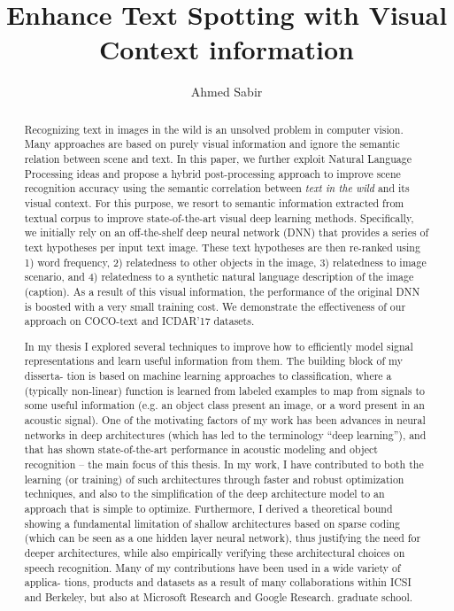\documentclass[phd,tocprelim]{cornell}
\title {Enhance Text Spotting with Visual Context information}
\author {Ahmed Sabir}
\begin{document}
\maketitle
\makecopyright

\begin{abstract}
Recognizing text   in  images in the wild is an unsolved problem  in computer vision. Many  approaches are based on purely visual information and ignore the semantic relation between scene and text. In this paper, we further exploit Natural Language Processing  ideas and propose a hybrid post-processing approach to improve scene recognition accuracy using the semantic correlation between  \textit{text in the wild} and its visual context. For this purpose,  we resort to semantic information extracted from textual corpus to improve state-of-the-art visual deep learning methods. Specifically, we initially rely on an off-the-shelf deep neural network (DNN) that provides a series of text hypotheses per input text image. These text hypotheses are then re-ranked using 1) word frequency, 2) relatedness to other objects in the image, 3) relatedness to image scenario, and 4) relatedness to a synthetic natural language description of the image (caption). As a result of this visual information, the performance of the original DNN is boosted with a very small training cost. We demonstrate the effectiveness of our approach on COCO-text and ICDAR'17 datasets. 

In my thesis I explored several techniques to improve how to efficiently model signal
representations and learn useful information from them.  The building block of my disserta-
tion is based on machine learning approaches to classification, where a (typically non-linear)
function is learned from labeled examples to map from signals to some useful information
(e.g.  an object class present an image, or a word present in an acoustic signal).  One of the
motivating factors of my work has been advances in neural networks in deep architectures
(which  has  led  to  the  terminology  “deep  learning”),  and  that  has  shown  state-of-the-art
performance in acoustic modeling and object recognition – the main focus of this thesis.
In  my  work,  I  have  contributed  to  both  the  learning  (or  training)  of  such  architectures
through  faster  and  robust  optimization  techniques,  and  also  to  the  simplification  of  the
deep architecture model to an approach that is simple to optimize.  Furthermore, I derived
a  theoretical  bound  showing  a  fundamental  limitation  of  shallow  architectures  based  on
sparse coding (which can be seen as a one hidden layer neural network), thus justifying the
need for deeper architectures, while also empirically verifying these architectural choices on
speech recognition.  Many of my contributions have been used in a wide variety of applica-
tions, products and datasets as a result of many collaborations within ICSI and Berkeley,
but also at Microsoft Research and Google Research.
graduate school.
\end{abstract}
\end{document}
